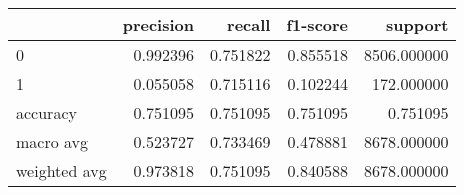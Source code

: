\begin{tabular}{lrrrr}
\toprule
{} &  precision &    recall &  f1-score &      support \\
\midrule
0            &   0.992396 &  0.751822 &  0.855518 &  8506.000000 \\
1            &   0.055058 &  0.715116 &  0.102244 &   172.000000 \\
accuracy     &   0.751095 &  0.751095 &  0.751095 &     0.751095 \\
macro avg    &   0.523727 &  0.733469 &  0.478881 &  8678.000000 \\
weighted avg &   0.973818 &  0.751095 &  0.840588 &  8678.000000 \\
\bottomrule
\end{tabular}

